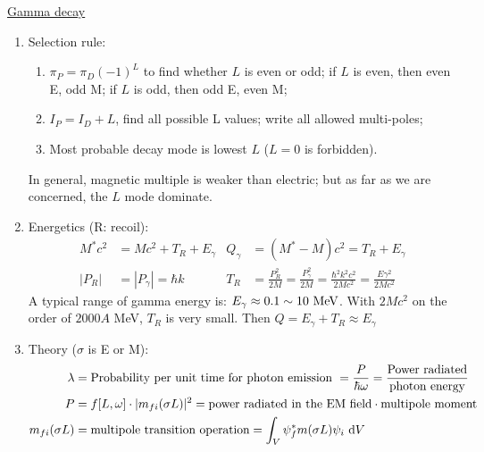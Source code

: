 \documentclass{school-22.101-notes}
\begin{document}
\clearpage
\uline{Gamma decay}
\begin{enumerate}
\item Selection rule:
    \begin{enumerate}
    \item  $\pi_P = \pi_D (-1)^L$ to find whether $L$ is even or odd; if $L$ is even, then even E, odd M; if $L$ is odd, then odd E, even M;
    \item $I_P = I_D + L$, find all possible L values; write all allowed multi-poles;
    \item Most probable decay mode is lowest $L$ ($L=0$ is forbidden). 
    \end{enumerate}
    In general, magnetic multiple is weaker than electric; but as far as we are concerned, the $L$ mode dominate. 
\item Energetics (R: recoil):
\begin{align}
M^* c^2 &= Mc^2 + T_R + E_{\gamma}  & Q_{\gamma} &=  (M^* - M)c^2  = T_R + E_{\gamma} \\
|P_R| &= |P_{\gamma}| = \hbar k & T_R &= \frac{P_R^2}{2M} = \frac{P_{\gamma}^2}{2M} = \frac{\hbar^2 k^2 c^2}{2Mc^2} = \frac{E \gamma^2}{2Mc^2} 
\end{align}
A typical range of gamma energy is: $E_{\gamma} \approx 0.1 \sim 10 \mbox{ } \mathrm{MeV}$. With $2Mc^2$ on the order of $2000 A$ MeV, $T_R$ is very small. Then $Q = E_{\gamma} + T_R \approx E_{\gamma}$
\item Theory ($\sigma$ is E or M): 
\begin{align}
\lambda &= \mbox{Probability per unit time for photon emission } = \frac{P}{\hbar \omega} = \frac{\mbox{Power radiated}}{\mbox{photon energy}} \\
P&= f[L,\omega] \cdot |m_{fi} (\sigma L)|^2 = \mbox{power radiated in the EM field} \cdot \mbox{multipole moment} \\
m_{fi} (\sigma L) &= \mbox{multipole transition operation} = \int_V \psi_f^* m(\sigma L) \psi_i \mbox{ }\mathrm{d} V 
\end{align}
\end{enumerate}
\end{document}
